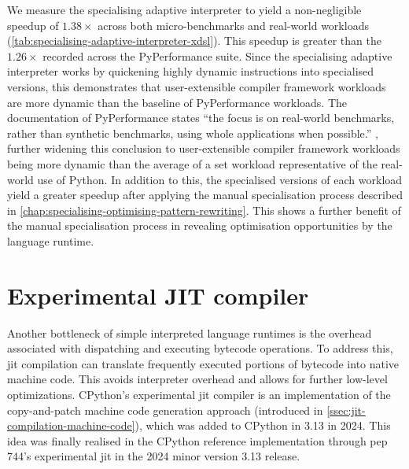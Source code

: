 We measure the specialising adaptive interpreter to yield a non-negligible speedup of $1.38\times$ across both micro-benchmarks and real-world workloads (\autoref{tab:specialising-adaptive-interpreter-xdsl}).
This speedup is greater than the $1.26\times$ recorded across the PyPerformance suite. Since the specialising adaptive interpreter works by quickening highly dynamic instructions into specialised versions, this demonstrates that user-extensible compiler framework workloads are more dynamic than the baseline of PyPerformance workloads.
The documentation of PyPerformance states ``the focus is on real-world benchmarks, rather than synthetic benchmarks, using whole applications when possible.'' \cite{collinwinterPythonPyperformance2025}, further widening this conclusion to user-extensible compiler framework workloads being more dynamic than the average of a set workload representative of the real-world use of Python.
In addition to this, the specialised versions of each workload yield a greater speedup after applying the manual specialisation process described in \autoref{chap:specialising-optimising-pattern-rewriting}. This shows a further benefit of the manual specialisation process in revealing optimisation opportunities by the language runtime.



\section{Experimental JIT compiler}
\label{sec:experimental-jit-compiler}

Another bottleneck of simple interpreted language runtimes is the overhead associated with dispatching and executing bytecode operations.
To address this, \acf{jit} compilation can translate frequently executed portions of bytecode into native machine code. This avoids interpreter overhead and allows for further low-level optimizations.
CPython's experimental \ac{jit} compiler is an implementation of the copy-and-patch machine code generation approach (introduced in \autoref{ssec:jit-compilation-machine-code}), which was added to CPython in 3.13 in 2024.
This idea was finally realised in the CPython reference implementation through \ac{pep} 744's experimental \ac{jit} in the 2024 minor version 3.13 release.


